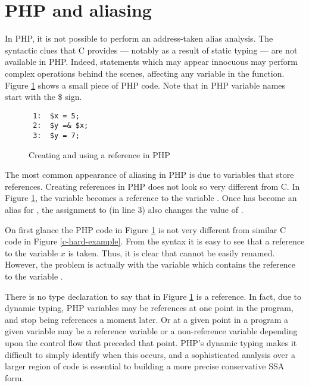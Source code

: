 \section{PHP and aliasing}


In PHP, it is not possible to perform an address-taken alias analysis.
The syntactic clues that C provides --- notably as a result of static
typing --- are not available in PHP.  Indeed, statements which may
appear innocuous may perform complex operations behind the scenes,
affecting any variable in the function. Figure \ref{php-reference}
shows a small piece of PHP code. Note that in PHP variable names
start with the \$ sign.

\begin{figure}[thp]
\begin{verbatim}
 1:  $x = 5;
 2:  $y =& $x;
 3:  $y = 7;
\end{verbatim}
\caption{Creating and using a reference in PHP}
\label{php-reference}
\end{figure}

The most common appearance of aliasing in PHP is due to variables that
store references. Creating references in PHP does not look so very
different from C. In Figure \ref{php-reference}, the variable 
becomes a reference to the variable . Once  has become an alias
for , the assignment to  (in line 3) also changes the value of
.

On first glance the PHP code in Figure \ref{php-reference} is not very
different from similar C code in Figure \ref{c-hard-example}. From the
syntax it is easy to see that a reference to the variable $x$ is
taken.  Thus, it is clear that  cannot be easily renamed. However,
the problem is actually with the variable  which contains the
reference to the variable .

There is no type declaration to say that  in Figure
\ref{php-reference} is a reference. In fact, due to dynamic typing,
PHP variables may be references at one point in the program, and stop
being references a moment later. Or at a given point in a program a
given variable may be a reference variable or a non-reference variable
depending upon the control flow that preceded that point.  PHP's
dynamic typing makes it difficult to simply identify when this occurs,
and a sophisticated analysis over a larger region of code is essential
to building a more precise conservative SSA form.

